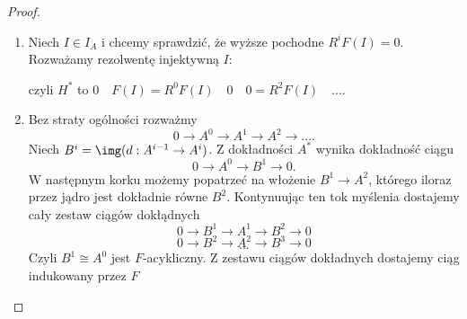\begin{proof}
  \begin{enumerate}
    \item Niech $I\in I_A$ i chcemy sprawdzić, że wyższe pochodne $R^iF(I)=0$. Rozważamy rezolwentę injektywną $I$:
      \begin{center}\end{center}
      czyli $H^*$ to $0\quad F(I)=R^0F(I) \quad 0\quad 0=R^2F(I)\quad ...$.
    \item  Bez straty ogólności rozważmy
      $$0\to A^0\to A^1\to A^2\to....$$
      Niech $B^i=\img(d:A^{i-1}\to A^i)$. Z dokładności $A^*$ wynika dokładność ciągu
      $$0\to A^0\to B^1\to 0.$$
      W następnym korku możemy popatrzeć na włożenie $B^1\to A^2$, którego iloraz przez jądro jest dokładnie równe $B^2$. Kontynuując ten tok myślenia dostajemy cały zestaw ciągów dokłądnych
      $$0\to B^1\to A^1\to B^2\to 0$$
      $$0\to B^2\to A^2\to B^3\to 0$$
      $$...$$
      Czyli $B^1\cong A^0$ jest $F$-acykliczny. Z zestawu ciągów dokładnych dostajemy ciąg indukowany przez $F$
      \begin{center}\end{center}


\end{enumerate}
\end{proof}
